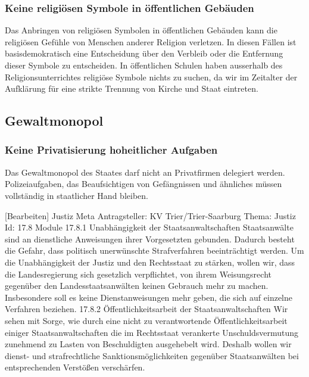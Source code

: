 \label{justiz:symbole2}
\subsubsection{Keine religiösen Symbole in öffentlichen Gebäuden}
Das Anbringen von religiösen Symbolen in öffentlichen Gebäuden kann die religiösen Gefühle von Menschen anderer Religion verletzen. In diesen Fällen ist basisdemokratisch eine Entscheidung über den Verbleib oder die Entfernung dieser Symbole zu entscheiden. In öffentlichen Schulen haben ausserhalb des Religionsunterrichtes religiöse Symbole nichts zu suchen, da wir im Zeitalter der Aufklärung für eine strikte Trennung von Kirche und Staat eintreten.
 
\newpage
\subsection*{Gewaltmonopol}
\subsubsection{Keine Privatisierung hoheitlicher Aufgaben}
Das Gewaltmonopol des Staates darf nicht an Privatfirmen delegiert werden. Polizeiaufgaben, das Beaufsichtigen von Gefängnissen und ähnliches müssen vollständig in staatlicher Hand bleiben.
 
[Bearbeiten] Justiz
Meta
Antragsteller: 	KV Trier/Trier-Saarburg
Thema: 	Justiz
Id: 	17.8
Module
17.8.1 Unabhängigkeit der Staatsanwaltschaften 	Staatsanwälte sind an dienstliche Anweisungen ihrer Vorgesetzten gebunden. Dadurch besteht die Gefahr, dass politisch unerwünschte Strafverfahren beeinträchtigt werden. Um die Unabhängigkeit der Justiz und den Rechtsstaat zu stärken, wollen wir, dass die Landesregierung sich gesetzlich verpflichtet, von ihrem Weisungsrecht gegenüber den Landesstaatsanwälten keinen Gebrauch mehr zu machen. Insbesondere soll es keine Dienstanweisungen mehr geben, die sich auf einzelne Verfahren beziehen.
17.8.2 Öffentlichkeitsarbeit der Staatsanwaltschaften 	Wir sehen mit Sorge, wie durch eine nicht zu verantwortende Öffentlichkeitsarbeit einiger Staatsanwaltschaften die im Rechtsstaat verankerte Unschuldsvermutung zunehmend zu Lasten von Beschuldigten ausgehebelt wird. Deshalb wollen wir dienst- und strafrechtliche Sanktionsmöglichkeiten gegenüber Staatsanwälten bei entsprechenden Verstößen verschärfen.
 
